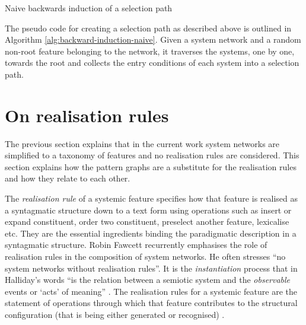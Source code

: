     \begin{algorithm}[!ht]
        \Input {\feature, \snet}
        \caption{Naive backwards induction of a selection path}
        \label{alg:backward-induction-naive}
    \end{algorithm}

    The pseudo code for creating a selection path as described above is outlined in Algorithm \ref{alg:backward-induction-naive}. Given a system network and a random non-root feature belonging to the network, it traverses the systems, one by one, towards the root and collects the entry conditions of each system into a selection path.

\section{On realisation rules}
\label{sec:realisation-reules}
    The previous section explains that in the current work system networks are simplified to a taxonomy of features and no realisation rules are considered. This section explains how the pattern graphs are a substitute for the realisation rules and how they relate to each other.

    The \textit{realisation rule} of a systemic feature specifies how that feature is realised as a syntagmatic structure down to a text form using operations such as insert or expand constituent, order two constituent, preselect another feature, lexicalise etc. They are the essential ingredients binding the paradigmatic description in a syntagmatic structure. Robin Fawcett recurrently emphasises the role of realisation rules in the composition of system networks. He often stresses ``no system networks without realisation rules''. It is the \textit{instantiation} process that in Halliday's words ``is the relation between a semiotic system and the \textit{observable} events or `acts' of meaning'' \citep[emphasis added]{Halliday2003-systemic-theory}. The realisation rules for a systemic feature are the statement of operations through which that feature contributes to the structural configuration (that is being either generated or recognised) \citep[p.86]{Fawcett2000}.


